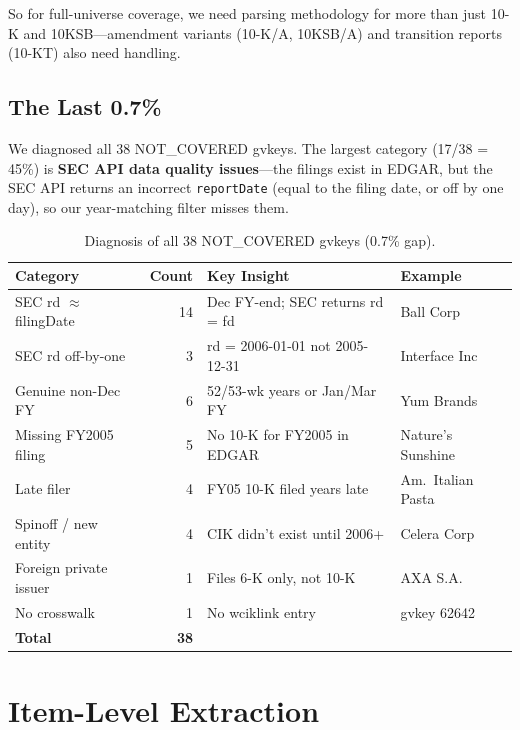\documentclass[11pt]{article}
\begin{document}
So for full-universe coverage, we need parsing methodology for more than just
10-K and 10KSB---amendment variants (10-K/A, 10KSB/A) and transition reports
(10-KT) also need handling.

\subsection{The Last 0.7\%}

We diagnosed all 38 NOT\_COVERED gvkeys. The largest category (17/38 = 45\%) is
\textbf{SEC API data quality issues}---the filings exist in EDGAR, but the SEC
API returns an incorrect \texttt{reportDate} (equal to the filing date, or off by
one day), so our year-matching filter misses them.

\begin{table}[h]
\centering
\small
\begin{tabular}{lrll}
\toprule
Category & Count & Key Insight & Example \\
\midrule
SEC rd $\approx$ filingDate & 14 & Dec FY-end; SEC returns rd = fd & Ball Corp \\
SEC rd off-by-one           & 3  & rd = 2006-01-01 not 2005-12-31 & Interface Inc \\
Genuine non-Dec FY          & 6  & 52/53-wk years or Jan/Mar FY   & Yum Brands \\
Missing FY2005 filing       & 5  & No 10-K for FY2005 in EDGAR    & Nature's Sunshine \\
Late filer                  & 4  & FY05 10-K filed years late      & Am.\ Italian Pasta \\
Spinoff / new entity        & 4  & CIK didn't exist until 2006+   & Celera Corp \\
Foreign private issuer      & 1  & Files 6-K only, not 10-K       & AXA S.A. \\
No crosswalk                & 1  & No wciklink entry              & gvkey 62642 \\
\midrule
\textbf{Total}              & \textbf{38} & & \\
\bottomrule
\end{tabular}
\caption{Diagnosis of all 38 NOT\_COVERED gvkeys (0.7\% gap).}
\end{table}

\section{Item-Level Extraction}
\end{document}
